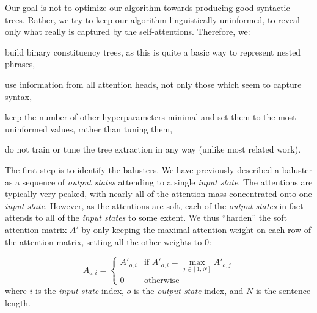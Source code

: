 \documentclass[11pt,a4paper]{article}
\newcommand{\word}{\emph{input state}\xspace}
\newcommand{\words}{\emph{input states}\xspace}
\newcommand{\state}{\emph{output state}\xspace}
\newcommand{\states}{\emph{output states}\xspace}
\def\RR#1{{\color{blue}RR: \it #1}}
\def\DM#1{{\color{red}DM: \it #1}}
\def\JL#1{{\color{magenta}JL: \it #1}}
\def\DEL#1{{\color{green}SMAZAT: \it #1}}
\def\JL#1{}
\def\RR#1{}
\def\DM#1{}
\def\DEL#1{}
\begin{document}
Our goal is not to optimize our algorithm towards producing good syntactic trees. Rather, we try to keep our algorithm linguistically uninformed, to reveal only what really is captured by the self-attentions.
Therefore, we:
\begin{compactitem}
\item build binary constituency trees, as this is quite a
basic
way to represent nested phrases,
\item use information from all attention heads, not only those which seem to capture syntax,
\item keep the number of other hyperparameters minimal and set them to the most uninformed values, rather than tuning them,
\item do not train or tune the tree extraction in any way (unlike most related work).
\end{compactitem}

The first step is to identify the balusters.
We have previously described a baluster as a sequence of \states attending to a single \word.
The attentions are typically very peaked, with nearly all of the attention mass concentrated onto one \word.
However, as the attentions are soft, each of the \states in fact attends to all of the \words to some extent.
We thus ``harden'' the soft attention matrix $A'$ by only keeping the maximal attention weight on each row of the attention matrix, setting all the other weights to 0:
\DEL{(see also Figure~\ref{fig:line}):}
\begin{equation}
A_{o, i} = \begin{cases} A'_{o, i} & \text{if } A'_{o, i} = \max_{j \in [1,N]} A'_{o, j}\\
0 & \text{otherwise}\end{cases}
\end{equation}
where $i$ is the \word index, $o$ is the \state index,
and $N$ is the sentence length.

\DEL{
\begin{figure}
\begin{center}
\texttt{[image: balustrades/line]}
\end{center}
\caption{Hardening the attention on one row.}
\label{fig:line}
\end{figure}
}

\end{document}
